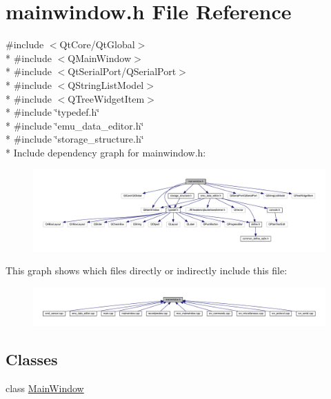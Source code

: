 \hypertarget{a00039}{\section{mainwindow.\+h File Reference}
\label{a00039}
}
{\ttfamily \#include $<$Qt\+Core/\+Qt\+Global$>$}\\*
{\ttfamily \#include $<$Q\+Main\+Window$>$}\\*
{\ttfamily \#include $<$Qt\+Serial\+Port/\+Q\+Serial\+Port$>$}\\*
{\ttfamily \#include $<$Q\+String\+List\+Model$>$}\\*
{\ttfamily \#include $<$Q\+Tree\+Widget\+Item$>$}\\*
{\ttfamily \#include \char`\"{}typedef.\+h\char`\"{}}\\*
{\ttfamily \#include \char`\"{}emu\+\_\+data\+\_\+editor.\+h\char`\"{}}\\*
{\ttfamily \#include \char`\"{}storage\+\_\+structure.\+h\char`\"{}}\\*
Include dependency graph for mainwindow.\+h\+:
\nopagebreak
\begin{figure}[H]
\begin{center}
\leavevmode
\includegraphics[width=350pt]{d1/db7/a00157}
\end{center}
\end{figure}
This graph shows which files directly or indirectly include this file\+:
\nopagebreak
\begin{figure}[H]
\begin{center}
\leavevmode
\includegraphics[width=350pt]{d6/db8/a00158}
\end{center}
\end{figure}
\subsection*{Classes}
\begin{DoxyCompactItemize}
\item 
class \hyperlink{a00006}{Main\+Window}
\end{DoxyCompactItemize}
